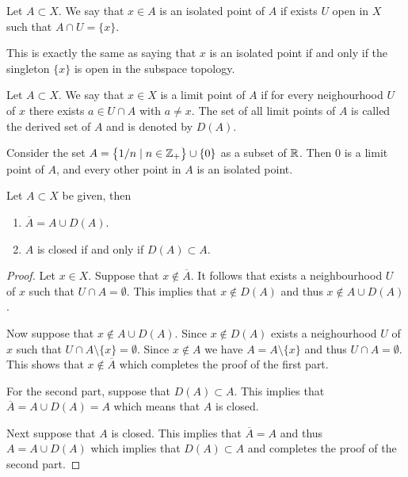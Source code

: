 \documentclass[11pt,a4paper]{article}
\begin{document}
\begin{definition}
  Let $A \subset X$. We say that $x \in A$ is an isolated point of
  $A$ if exists $U$ open in $X$ such that $A \cap U = \{x\}$.
\end{definition}

\begin{remark}
  This is exactly the same as saying that $x$ is an isolated point if and
  only if the singleton $\{x\}$ is open in the subspace topology.
\end{remark}

\begin{definition}
  Let $A \subset X$. We say that $x \in X$ is a limit point of $A$ if for every
  neighourhood $U$ of $x$ there exists $a \in U \cap A$ with $a \neq x$.
  The set of all limit points of $A$ is called the derived set of $A$
  and is denoted by $D(A)$.
\end{definition}

\begin{example}
  Consider the set $A = \left\{1/n \mid n \in \mathbb{Z}_{+}\right\} \cup \{0\}$ as
  a subset of $\mathbb{R}$. Then $0$ is a limit point of $A$, and every
  other point in $A$ is an isolated point.
\end{example}

\begin{proposition}
  Let $A \subset X$ be given, then
  \begin{enumerate}
    \item $\overline{A} = A \cup D(A)$.
    \item $A$ is closed if and only if $D(A) \subset A$.
  \end{enumerate}
\end{proposition}
\begin{proof}
  Let $x \in X$. Suppose that $x \notin \overline A$. It follows that
  exists a neighbourhood $U$ of $x$ such that $U \cap A = \emptyset$.
  This implies that $x \notin D(A)$ and thus $x \notin A \cup D(A)$.

  Now suppose that $x \notin A \cup D(A)$. Since $x \notin D(A)$ exists
  a neighourhood $U$ of $x$ such that $U \cap A \setminus \{x\} = \emptyset$.
  Since $x \notin A$ we have $A = A \setminus \{x\}$ and thus
  $U \cap A = \emptyset$. This shows that $x \notin \overline A$ which
  completes the proof of the first part.

  For the second part, suppose that $D(A) \subset A$. This implies
  that $\overline A = A \cup D(A) = A$ which means that $A$ is closed.

  Next suppose that $A$ is closed. This implies that $\overline A = A$ and
  thus $A = A \cup D(A)$ which implies that $D(A) \subset A$ and completes
  the proof of the second part.
\end{proof}
\end{document}
